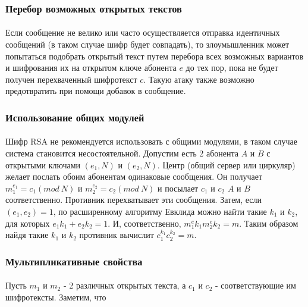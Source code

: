 \subsubsection{Перебор возможных открытых текстов}

  \paragraph{} Если сообщение не велико или часто осуществляется отправка идентичных сообщений (в таком случае шифр будет совпадать), то злоумышленник может попытаться подобрать открытый текст путем перебора всех возможных вариантов и шифрования их на открытом ключе абонента $e$ до тех пор, пока не будет получен перехваченный 
  шифротекст $c$. Такую атаку также возможно предотвратить при помощи добавок в сообщение.

\subsubsection{Использование общих модулей}

  \paragraph{} Шифр RSA не рекомендуется использовать с общими модулями, в таком случае система  становится несостоятельной. Допустим есть 2 абонента $A$ и $B$ с 
  открытыми ключами $(e_{1}, N)$ и $(e_{2}, N)$. Центр (общий сервер или циркуляр) желает послать обоим абонентам одинаковые сообщения. 
  Он получает $m_1^{e_1} = c_1(mod \: N)$ и $m_2^{e_2} = c_2(mod \: N)$ и посылает $c_1$ и 
  $c_2$ $A$ и $B$ соответственно. Противник перехватывает эти сообщения. Затем, если $(e_1, e_2) = 1$, по 
  расширенному алгоритму Евклида можно найти такие $k_1$ и $k_2$, для которых $e_1 k_1 + e_2 k_2 = 1$. И, соответственно, 
  $m_1^e k_1 m_2^e k_2 = m$. Таким образом найдя такие $k_1$ и $k_2$ противник вычислит $c_1^{k_1} c_2^{k_2} = m$.

\subsubsection{Мультипликативные свойства}

  \paragraph{} Пусть $m_1$ и $m_2$ - 2 различных открытых текста, а $c_1$
  и $c_2$ - соответствующие им шифротексты. Заметим, что
  

